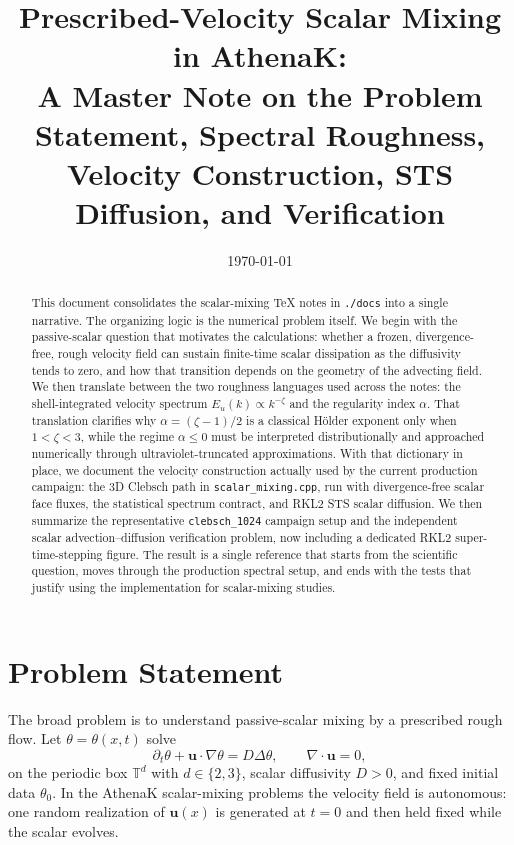 \documentclass[11pt]{article}
\title{Prescribed-Velocity Scalar Mixing in AthenaK:\\
A Master Note on the Problem Statement, Spectral Roughness,\\
Velocity Construction, STS Diffusion, and Verification}
\author{}
\date{\today}
\newcommand{\T}{\mathbb{T}}
\newcommand{\uu}{\mathbf{u}}
\newcommand{\code}[1]{\texttt{#1}}
\newcommand{\STS}{RKL2 super-time-stepping\xspace}
\begin{document}
\maketitle

\begin{abstract}
This document consolidates the scalar-mixing TeX notes in \code{./docs} into a single narrative. The organizing logic is the numerical problem itself. We begin with the passive-scalar question that motivates the calculations: whether a frozen, divergence-free, rough velocity field can sustain finite-time scalar dissipation as the diffusivity tends to zero, and how that transition depends on the geometry of the advecting field. We then translate between the two roughness languages used across the notes: the shell-integrated velocity spectrum $E_u(k)\propto k^{-\zeta}$ and the regularity index $\alpha$. That translation clarifies why $\alpha=(\zeta-1)/2$ is a classical H\"older exponent only when $1<\zeta<3$, while the regime $\alpha\le 0$ must be interpreted distributionally and approached numerically through ultraviolet-truncated approximations. With that dictionary in place, we document the velocity construction actually used by the current production campaign: the 3D Clebsch path in \code{scalar\_mixing.cpp}, run with divergence-free scalar face fluxes, the statistical spectrum contract, and RKL2 STS scalar diffusion. We then summarize the representative \code{clebsch\_1024} campaign setup and the independent scalar advection--diffusion verification problem, now including a dedicated \STS figure. The result is a single reference that starts from the scientific question, moves through the production spectral setup, and ends with the tests that justify using the implementation for scalar-mixing studies.
\end{abstract}

\section{Problem Statement}
The broad problem is to understand passive-scalar mixing by a prescribed rough flow. Let $\theta=\theta(x,t)$ solve
\begin{equation}
\partial_t \theta + \uu\cdot\nabla \theta = D\Delta\theta,
\qquad
\nabla\cdot\uu = 0,
\label{eq:scalar}
\end{equation}
on the periodic box $\T^d$ with $d\in\{2,3\}$, scalar diffusivity $D>0$, and fixed initial data $\theta_0$. In the AthenaK scalar-mixing problems the velocity field is autonomous: one random realization of $\uu(x)$ is generated at $t=0$ and then held fixed while the scalar evolves.
\end{document}
